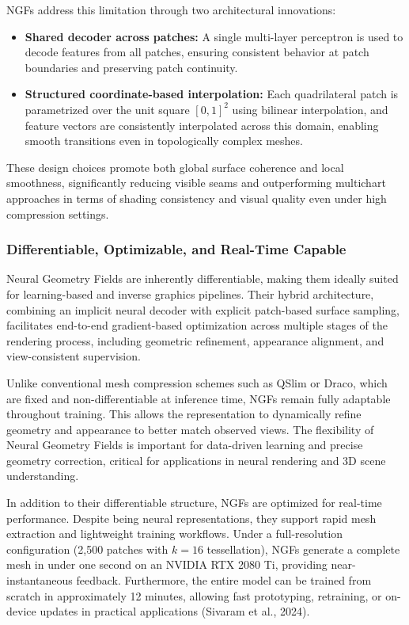 NGFs address this limitation through two architectural innovations:
\begin{itemize}
    \item \textbf{Shared decoder across patches:} A single multi-layer perceptron is used to decode features from all patches, ensuring consistent behavior at patch boundaries and preserving patch continuity.
    \item \textbf{Structured coordinate-based interpolation:} Each quadrilateral patch is parametrized over the unit square $[0,1]^2$ using bilinear interpolation, and feature vectors are consistently interpolated across this domain, enabling smooth transitions even in topologically complex meshes.
\end{itemize}

These design choices promote both global surface coherence and local smoothness, significantly reducing visible seams and outperforming multichart approaches in terms of shading consistency and visual quality even under high compression settings.

\subsubsection{Differentiable, Optimizable, and Real-Time Capable}

Neural Geometry Fields are inherently differentiable, making them ideally suited for learning-based and inverse graphics pipelines. 
Their hybrid architecture, combining an implicit neural decoder with explicit patch-based surface sampling, facilitates end-to-end gradient-based optimization across multiple stages of the rendering process, including geometric refinement, appearance alignment, and view-consistent supervision. 

Unlike conventional mesh compression schemes such as QSlim or Draco, which are fixed and non-differentiable at inference time, NGFs remain fully adaptable throughout training. 
This allows the representation to dynamically refine geometry and appearance to better match observed views. 
The flexibility of Neural Geometry Fields is important for data-driven learning and precise geometry correction, critical for applications in neural rendering and 3D scene understanding. 

In addition to their differentiable structure, NGFs are optimized for real-time performance. 
Despite being neural representations, they support rapid mesh extraction and lightweight training workflows. 
Under a full-resolution configuration (2,500 patches with $k=16$ tessellation), NGFs generate a complete mesh in under one second on an NVIDIA RTX 2080 Ti, providing near-instantaneous feedback. 
Furthermore, the entire model can be trained from scratch in approximately 12 minutes, allowing fast prototyping, retraining, or on-device updates in practical applications (Sivaram et al., 2024). 

